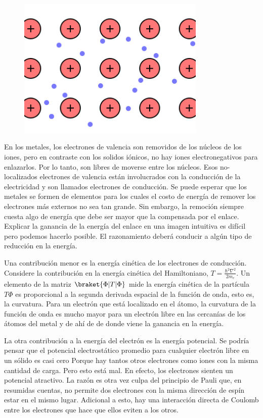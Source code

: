\documentclass{article}
\begin{document}
\begin{figure}[h]
    \centering
    \includegraphics[width=0.8\textwidth]{metallicbonding.png}
    
    \label{Figura 1}
\end{figure}

En los metales, los electrones de valencia son removidos de los núcleos de los iones, pero en contraste con los solidos iónicos, no hay iones electronegativos para enlazarlos. Por lo tanto, son libres de moverse entre los núcleos. Esos no-localizados electrones de valencia están involucrados con la conducción de la electricidad y son llamados electrones de conducción. Se puede esperar que los metales se formen de elementos para los cuales el costo de energía de remover los electrones más  externos no sea tan grande. Sin embargo, la remoción siempre cuesta algo de energía que debe ser mayor que la compensada por el enlace. Explicar la ganancia de la energía del enlace en una imagen intuitiva es difícil pero podemos hacerlo posible. El razonamiento deberá conducir a algún tipo de reducción en la energía.

Una contribución menor es la energía cinética de los electrones de conducción. Considere la contribución en la energía cinética del Hamiltoniano, $T = \frac{\hbar^{2} \nabla^{2}}{2m_{e}}$. Un elemento de la matriz $\braket{\Phi|T|\Phi}$ mide la energía cinética de la partícula $T\Phi$ es proporcional a la segunda derivada espacial de la función de onda, esto es, la curvatura. Para un electrón que está localizado en el átomo, la curvatura de la función de onda es mucho mayor para un electrón libre en las cercanías de los átomos del metal y de ahí de de donde viene la ganancia en la energía.

La otra contribución a la energía del electrón es la energía potencial. Se podría pensar que el potencial electrostático promedio para cualquier electrón libre en un sólido es casi cero Porque hay tantos otros electrones como iones con la misma cantidad de carga. Pero esto está mal. En efecto, los electrones sienten un potencial atractivo. La razón es otra vez culpa del principio de Pauli que, en resumidas cuentas, no permite dos electrones con la misma dirección de espín estar en el mismo lugar. Adicional a esto, hay una interacción directa de Coulomb entre los electrones que hace que ellos eviten a los otros. 
\end{document}
